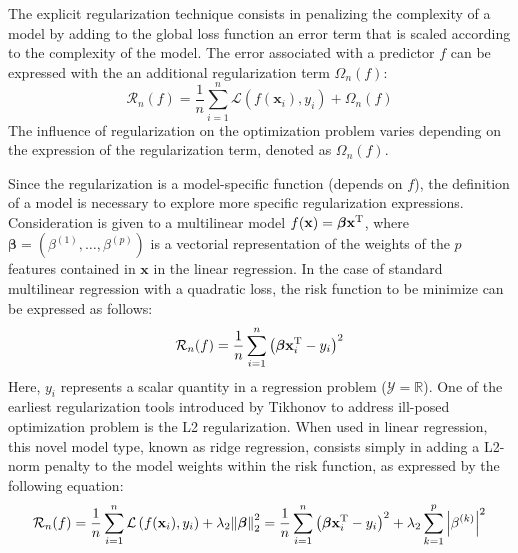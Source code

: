 \documentclass[main]{subfiles}
\begin{document}
The explicit regularization technique consists in penalizing the complexity of a model by adding to the global loss function an error term that is scaled according to the complexity of the model. The error associated with a predictor $f$ can be expressed with the an additional regularization term ${\Omega}_n(f)$:
\begin{equation}
  \mathcal{R}_n(f) = \frac{1}{n}\sum_{i=1}^n \mathcal{L}\left(f(\mathbf{x}_i),y_i\right) + \Omega_n(f)
\end{equation}
The influence of regularization on the optimization problem varies depending on the expression of the regularization term, denoted as ${\Omega}_n(f)$. 

Since the regularization is a model-specific function (depends on $f$), the definition of a model is necessary to explore more specific regularization expressions.
Consideration is given to a multilinear model $f(\mathbf{x}) = \boldsymbol{\beta}\mathbf{x}^{\text{T}}$, where $\boldsymbol{\beta}=(\beta^{(1)},\ldots,\beta^{(p)})$ is a vectorial representation of the weights of the $p$ features contained in $\mathbf{x}$ in the linear regression. In the case of standard multilinear regression with a quadratic loss, the risk function to be minimize can be expressed as follows:
\begin{equation}\label{eq:linear}
  \mathcal{R}_n(f) = \frac{1}{n}\sum_{i=1}^n {\left(\boldsymbol{\beta}\mathbf{x}_i^{\text{T}}-y_i\right)}^2 
\end{equation}
Here, $y_i$ represents a scalar quantity in a regression problem ($\mathcal{Y}=\mathbb{R}$). One of the earliest regularization tools introduced by Tikhonov to address ill-posed optimization problem is the L2 regularization. When used in linear regression, this novel model type, known as ridge regression, consists simply in adding a L2-norm penalty to the model weights within the risk function, as expressed by the following equation:
\begin{equation}\label{eq:L2_reg}
  \mathcal{R}_n(f) = \frac{1}{n}\sum_{i=1}^n \mathcal{L}\left(f(\mathbf{x}_i),y_i\right) + \lambda_2 {\lVert \boldsymbol{\beta} \rVert}_2^2 = \frac{1}{n}\sum_{i=1}^n {\left(\boldsymbol{\beta}\mathbf{x}_i^{\text{T}}-y_i\right)}^2 + \lambda_2 \sum_{k=1}^p \left|\beta^{(k)}\right|^2
\end{equation}
\end{document}
